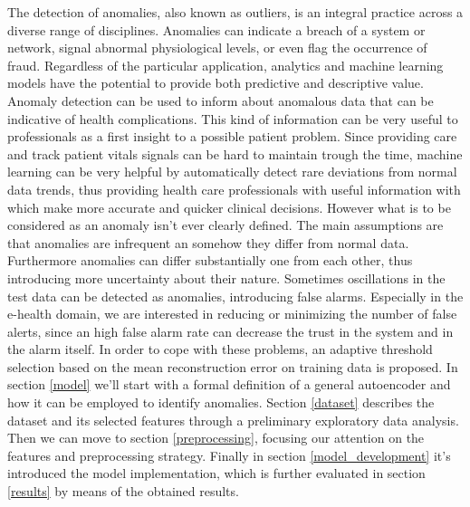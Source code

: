 \documentclass{article}
\begin{document}
\begin{multicols*}{2}
		The detection of anomalies, also known as outliers, is an integral practice across a diverse range of disciplines. Anomalies can indicate a breach of a system or network, signal abnormal physiological levels, or even flag the occurrence of fraud. Regardless of the particular application, analytics and machine learning models have the potential to provide both predictive and descriptive value. Anomaly detection can be used to inform about anomalous data that can be indicative of health complications. This kind of information can be very useful to professionals as a first insight to a possible patient problem. Since providing care and track patient vitals signals can be hard to maintain trough the time, machine learning can be very helpful by automatically detect rare deviations from normal data trends, thus providing health care professionals with useful information with which make more accurate and quicker clinical decisions. However what is to be considered as an anomaly isn't ever clearly defined. The main assumptions are that anomalies are infrequent an somehow they differ from normal data. Furthermore anomalies can differ substantially one from each other, thus introducing more uncertainty about their nature. Sometimes oscillations in the test data can be detected as anomalies, introducing false alarms. Especially in the e-health domain, we are interested in reducing or minimizing the number of false alerts, since an high false alarm rate can decrease the trust in the system and in the alarm itself.
		In order to cope with these problems, an adaptive threshold selection based on the mean reconstruction error on training data is proposed.
		In section \ref{model} we'll start with a formal definition of a general autoencoder and how it can be employed to identify anomalies. Section \ref{dataset} describes the dataset and its selected features through a preliminary exploratory data analysis. Then we can move to section \ref{preprocessing}, focusing our attention on the features and preprocessing strategy. Finally in section \ref{model_development} it's introduced the model implementation, which is further evaluated in section \ref{results} by means of the obtained results.
		

\end{multicols*}
\end{document}

